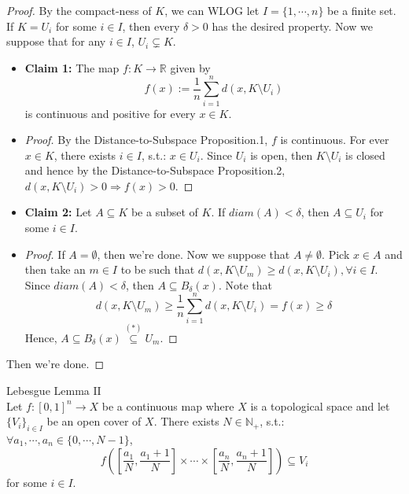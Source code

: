 \begin{proof}
    By the compact-ness of $K$, we can WLOG let $I= \{1,\cdots,n\}$ be a finite set. If $K=U_i$ for some $i \in I$, then every $\delta>0$ has the desired property. Now we suppose that for any $i \in I$, $U_i \subsetneq K$.
    \begin{itemize}
        \item \textbf{Claim 1:} The map $f:K \to \mathbb{R}$ given by
        $$f(x) := \frac{1}{n} \sum_{i=1}^n d(x, K \setminus U_i)$$
        is continuous and positive for every $x \in K$.

        \item \begin{proof}
            By the Distance-to-Subspace Proposition.1, $f$ is continuous. For ever $x \in K$, there exists $i \in I$, s.t.: $x \in U_i$. Since $U_i$ is open, then $K \setminus U_i$ is closed and hence by the Distance-to-Subspace Proposition.2, $d(x,K \setminus U_i) >0 \Rightarrow f(x) >0$.
        \end{proof}

        \item \textbf{Claim 2:} Let $A \subseteq K$ be a subset of $K$. If $diam(A) < \delta$, then $A\subseteq U_i$ for some $i \in I$.

        \item \begin{proof}
            If $A= \emptyset$, then we're done. Now we suppose that $A \neq \emptyset$. Pick $x \in A$ and then take an $m \in I$ to be such that $d(x, K\setminus U_m) \geq d (x,K \setminus U_i),\forall i\in I$. Since $diam(A)< \delta$, then $A \subseteq B_\delta (x)$. Note that
            \begin{equation*}
                d(x, K\setminus U_m) \geq \frac{1}{n} \sum_{i=1}^n d(x,K\setminus U_i) = f(x) \geq \delta \tag{*}
            \end{equation*}
            Hence, $A \subseteq B_\delta (x) \overset{(*)}{\subseteq} U_m$.
        \end{proof}
    \end{itemize}
    Then we're done.
\end{proof}


\begin{corollary}{Lebesgue Lemma $\mathrm{II}$}\\
Let $f: [0,1]^n \to X$ be a continuous map where $X$ is a topological space and let $\{V_i\}_{i \in I}$ be an open cover of $X$. There exists $N \in \mathbb{N}_+$, s.t.: $\forall a_1,\cdots,a_n \in \{0,\cdots, N-1\}$,
$$f([\frac{a_1}{N}, \frac{a_1+1}{N}] \times \cdots \times [\frac{a_n}{N}, \frac{a_n+1}{N}]) \subseteq V_i$$
for some $i\in I$.
\end{corollary}

